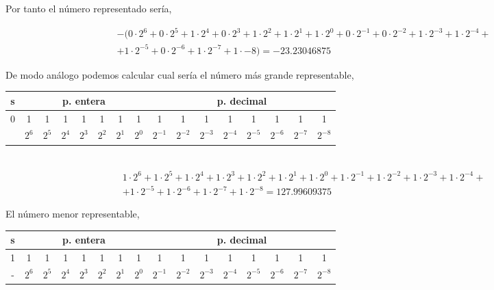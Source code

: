 Por tanto el número representado sería,

\begin{equation*}
\begin{split}
&-(0\cdot 2^6+0 \cdot 2^5+ 1\cdot 2^4+ 0 \cdot 2^3+ 1 \cdot 2^2 + 1 \cdot 2^1 + 1 \cdot 2^0 + 0 \cdot 2^{-1}+ 0 \cdot 2^{-2}+ 1 \cdot 2^{-3}+ 1 \cdot 2^{-4}+ \\
& +1 \cdot 2^{-5}+0 \cdot 2^{-6} +1 \cdot 2^{-7}+1 \cdot {-8}) = - 23.23046875
\end{split}
\end{equation*}

De modo análogo podemos calcular cual sería el número más grande representable,\\

\begin{tabular}{|c||c|c|c|c|c|c|c||c|c|c|c|c|c|c|c|}
\hline
s&\multicolumn{7}{c||}{p. entera}&\multicolumn{8}{c|}{p. decimal}\\
\hline
0&1&1&1&1&1&1&1&1&1&1&1&1&1&1&1\\
\hline
&$2^{6}$&$2^{5}$&$2^{4}$&$2^{3}$&$2^{2}$&$2^{1}$&$2^{0}$&$2^{-1}$&$2^{-2}$&$2^{-3}$&$2^{-4}$&$2^{-5}$&$2^{-6}$&$2^{-7}$&$2^{-8}$\\
\hline
\end{tabular}\\

\begin{equation*}
\begin{split}
&1\cdot 2^6+1 \cdot 2^5+ 1\cdot 2^4+ 1 \cdot 2^3+ 1 \cdot 2^2 + 1 \cdot 2^1 + 1 \cdot 2^0 + 1 \cdot 2^{-1}+ 1 \cdot 2^{-2}+ 1 \cdot 2^{-3}+ 1 \cdot 2^{-4}+ \\
&+1 \cdot 2^{-5}+1 \cdot 2^{-6} +1 \cdot 2^{-7}+ 1\cdot 2^{-8} =  127.99609375
\end{split}
\end{equation*}

El número menor representable,\\

\begin{tabular}{|c||c|c|c|c|c|c|c||c|c|c|c|c|c|c|c|}
\hline
s&\multicolumn{7}{c||}{p. entera}&\multicolumn{8}{c|}{p. decimal}\\
\hline
1&1&1&1&1&1&1&1&1&1&1&1&1&1&1&1\\
\hline
-&$2^{6}$&$2^{5}$&$2^{4}$&$2^{3}$&$2^{2}$&$2^{1}$&$2^{0}$&$2^{-1}$&$2^{-2}$&$2^{-3}$&$2^{-4}$&$2^{-5}$&$2^{-6}$&$2^{-7}$&$2^{-8}$\\
\hline
\end{tabular}\\

